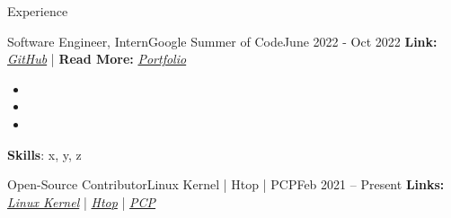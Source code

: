 \documentclass[]{Sohaib-Mohamed}
\begin{document}
\makeheader

\begin{cvsection}{Experience}
   \begin{cvsubsection}{Software Engineer, Intern}{Google Summer of Code}{June 2022 - Oct 2022}
      \textbf{Link:} \href{https://gist.github.com/smalinux/e869b376b5c77cacdcda4cb14f027632}{\textit{GitHub}} | \textbf{Read More:} \href{https://gist.github.com/smalinux/2e9c5537fdac65501a655280352c9c15#google-summer-of-code-2022}{\textit{Portfolio}}
      \begin{itemize}
         \item
         \item
         \item
      \end{itemize}
      \textbf{Skills}: x, y, z
   \end{cvsubsection}
   \begin{cvsubsection}{Open-Source Contributor}{Linux Kernel | Htop | PCP}{Feb 2021 -- Present}
      \textbf{Links:} \href{https://git.kernel.org/pub/scm/linux/kernel/git/next/linux-next.git/log/?qt=grep&q=sohaib}{\textit{Linux Kernel}} | \href{https://github.com/htop-dev/htop/commits?author=smalinux}{\textit{Htop}} | \href{https://github.com/performancecopilot/pcp/commits?author=smalinux}{\textit{PCP}}
      \begin{itemize}

\end{itemize}
\end{cvsubsection}
\end{cvsection}
\end{document}
